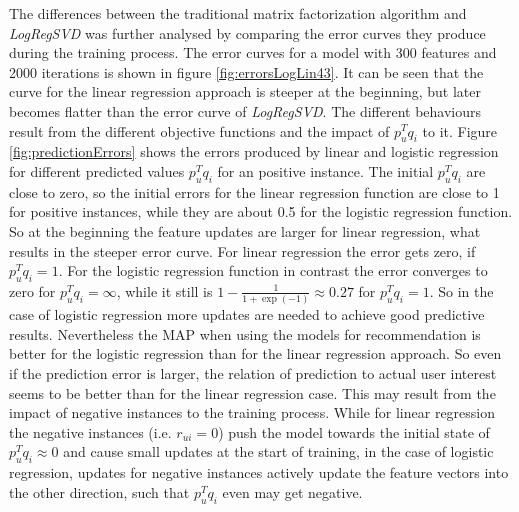 \documentclass[10pt]{reportMaster}
\begin{document}
The differences between the traditional matrix factorization algorithm and \textit{LogRegSVD} was further analysed by comparing the error curves they produce during the training process.
The error curves for a model with 300 features and 2000 iterations is shown in figure \ref{fig:errorsLogLin43}.
It can be seen that the curve for the linear regression approach is steeper at the beginning, but later becomes flatter than the error curve of \textit{LogRegSVD}.
The different behaviours result from the different objective functions and the impact of $p_u^Tq_i$ to it.
Figure \ref{fig:predictionErrors} shows the errors produced by linear and logistic regression for different predicted values $p_u^Tq_i$ for an positive instance.
The initial $p_u^Tq_i$ are close to zero, so the initial errors for the linear regression function are close to 1 for positive instances, while they are about 0.5 for the logistic regression function.
So at the beginning the feature updates are larger for linear regression, what results in the steeper error curve.
For linear regression the error gets zero, if $p_u^Tq_i = 1$.
For the logistic regression function in contrast the error converges to zero for $p_u^Tq_i = \infty$, while it still is $1 - \frac{1}{1 + \exp(-1)} \approx 0.27$ for $p_u^Tq_i = 1$.
So in the case of logistic regression more updates are needed to achieve good predictive results.
Nevertheless the MAP when using the models for recommendation is better for the logistic regression than for the linear regression approach.
So even if the prediction error is larger, the relation of prediction to actual user interest seems to be better than for the linear regression case.
This may result from the impact of negative instances to the training process.
While for linear regression the negative instances (i.e. $r_{ui} = 0$) push the model towards the initial state of $p_u^Tq_i \approx 0$ and cause small updates at the start of training, in the case of logistic regression, updates for negative instances actively update the feature vectors into the other direction, such that $p_u^Tq_i$ even may get negative.
\end{document}
